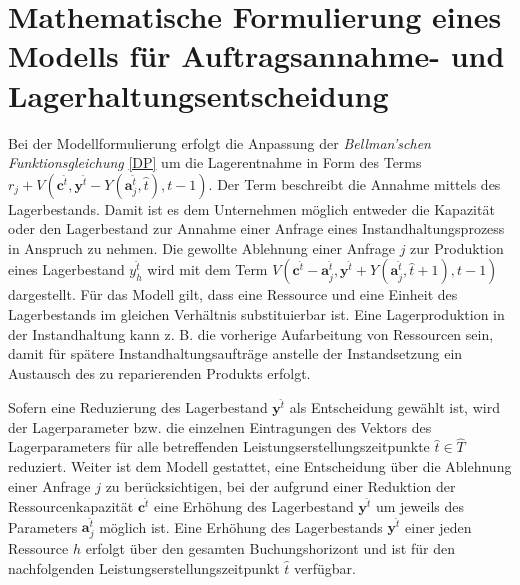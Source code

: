 \section{Mathematische Formulierung eines Modells für Auftragsannahme- und Lagerhaltungsentscheidung}\label{Umformung}

Bei der Modellformulierung erfolgt die Anpassung der \textit{Bellman'schen Funktionsgleichung}  \eqref{DP} um die Lagerentnahme in Form des Terms $r_{j} + V(\textbf{c}^{\hat t}, \textbf{y}^{\hat t}-Y(\textbf{a}_j^{\hat t}, \hat t), t-1)$. Der Term beschreibt die Annahme mittels des Lagerbestands. Damit ist es dem Unternehmen möglich entweder die Kapazität oder den Lagerbestand zur Annahme einer Anfrage eines Instandhaltungsprozess in Anspruch zu nehmen. Die gewollte Ablehnung einer Anfrage $j$ zur Produktion eines Lagerbestand $y_h^{\hat t}$ wird mit dem Term $V(\textbf{c}^{\hat t}-\textbf{a}^{\hat t}_j, \textbf{y}^{\hat t}+Y(\textbf{a}^{\hat t}_j, \hat t +1), t-1)$ dargestellt. Für das Modell gilt, dass eine Ressource und eine Einheit des Lagerbestands im gleichen Verhältnis substituierbar ist. Eine Lagerproduktion in der Instandhaltung kann z. B. die vorherige Aufarbeitung von Ressourcen sein, damit für spätere Instandhaltungsaufträge anstelle der Instandsetzung ein Austausch des zu reparierenden Produkts erfolgt.

Sofern eine Reduzierung des Lagerbestand $\textbf{y}^{\hat t}$ als Entscheidung gewählt ist, wird der Lagerparameter bzw. die einzelnen Eintragungen des Vektors des Lagerparameters für alle betreffenden Leistungserstellungszeitpunkte $\hat t\in \hat T$ reduziert. Weiter ist dem Modell gestattet, eine Entscheidung über die Ablehnung einer Anfrage $j$ zu berücksichtigen, bei der aufgrund einer Reduktion der Ressourcenkapazität $\textbf{c}^{\hat t}$ eine Erhöhung des Lagerbestand $\textbf{y}^{\hat t}$ um jeweils des Parameters $\textbf{a}_j^{\hat t}$ möglich ist. Eine Erhöhung des Lagerbestands $\textbf{y}^{\hat t}$ einer jeden Ressource $h$ erfolgt über den gesamten Buchungshorizont und ist für den nachfolgenden Leistungserstellungszeitpunkt $\hat t$ verfügbar. %

